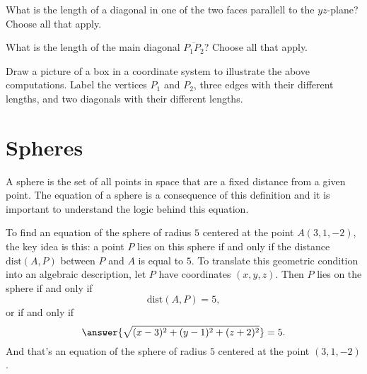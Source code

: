 \documentclass{ximera}
\begin{document}
\begin{question} \label{Q32sdfdsftgt}
What is the length of a diagonal in one of the two faces parallell to the $yz$-plane? Choose all that apply. 
\begin{selectAll}
\end{selectAll}
\end{question}

\begin{question} \label{Q32sdfdsftgt}
What is the length of the main diagonal $\overline{P_1P_2}$? Choose all that apply. 
\begin{selectAll}
\end{selectAll}
\end{question}

\begin{question}
\begin{freeResponse}
Draw a picture of a box in a coordinate system to illustrate the above computations. Label the vertices $P_1$ and $P_2$,  three edges with their different lengths, and two diagonals with their different lengths. 
\end{freeResponse}
\end{question}

\section*{Spheres}
A sphere is the set of all points in space that are a fixed distance from a given point. The equation of a sphere is a consequence of this definition and it is important to understand the logic behind this equation.

\begin{question}   \label{QDfsdgfte}
To find an equation of the sphere of radius $5$ centered at the point $A(3,1,-2)$, the key idea is this: a point $P$ lies on this sphere  if and only if the distance $\text{dist}(A,P)$ between $P$ and $A$ is equal to $5$. To translate this geometric condition into an algebraic description, let $P$ have coordinates $(x,y,z)$. Then $P$ lies on the sphere if and only if
\[
   \text{dist}(A,P) = 5 ,
\]
or if and only if 
\[
      \answer{\sqrt{(x-3)^2+ (y-1)^2 + (z+2)^2}} = 5   .
\]
And that's an equation of the sphere of radius $5$ centered at the point $(3,1,-2)$.
\end{question}
\end{document}
